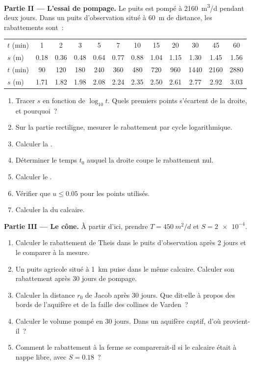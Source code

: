 \begin{problem}
\medskip\noindent\textbf{Partie II --- L'essai de pompage.} Le puits est pompé
à \qty{2160}{m^3/d} pendant deux jours. Dans un puits d'observation situé à \qty{60}{m}
de distance, les rabattements sont~:
\begin{center}
\begin{tabular}{l*{11}{c}}
\hline
$t$ (\unit{min}) & 1 & 2 & 3 & 5 & 7 & 10 & 15 & 20 & 30 & 45 & 60\\
$s$ (\unit{m}) & 0.18 & 0.36 & 0.48 & 0.64 & 0.77 & 0.88 & 1.04 & 1.15 & 1.30 & 1.45 & 1.56\\
\hline
$t$ (\unit{min}) & 90 & 120 & 180 & 240 & 360 & 480 & 720 & 960 & 1440 & 2160 & 2880\\
$s$ (\unit{m}) & 1.71 & 1.82 & 1.98 & 2.08 & 2.24 & 2.35 & 2.50 & 2.61 & 2.77 & 2.92 & 3.03\\
\hline
\end{tabular}
\end{center}
\begin{enumerate}[resume]
\item Tracer $s$ en fonction de $\log_{10}t$. Quels premiers points s'écartent de la
  droite, et pourquoi~?
\item Sur la partie rectiligne, mesurer le rabattement par cycle logarithmique.
\item Calculer la .
\item Déterminer le temps $t_0$ auquel la droite coupe le rabattement nul.
\item Calculer le .
\item Vérifier que $u \le 0.05$ pour les points utilisés.
\item Calculer la  du calcaire.
\end{enumerate}

\medskip\noindent\textbf{Partie III --- Le cône.} À partir d'ici, prendre $T =
\qty{450}{m^2/d}$ et $S = \num{2e-4}$.
\begin{enumerate}[resume]
\item Calculer le rabattement de Theis dans le puits d'observation après 2 jours et
  le comparer à la mesure.
\item Un puits agricole situé à \qty{1}{km} puise dans le même calcaire. Calculer son
  rabattement après 30 jours de pompage.
\item Calculer la distance $r_0$ de Jacob après 30 jours. Que dit-elle à propos des
  bords de l'aquifère et de la faille des collines de Varden~?
\item Calculer le volume pompé en 30 jours. Dans un aquifère captif, d'où
  provient-il~?
\item Comment le rabattement à la ferme se comparerait-il si le calcaire était
  à nappe libre, avec $S = 0.18$~?
\end{enumerate}


\end{problem}
